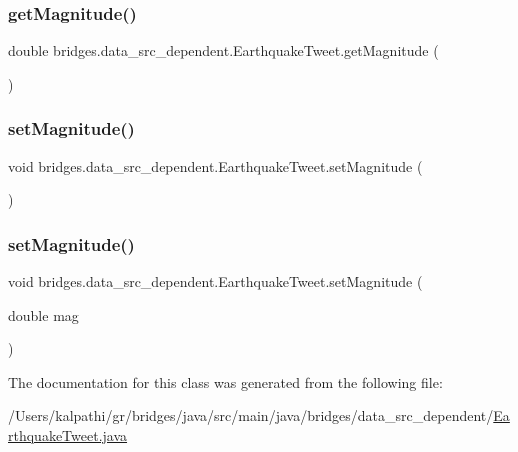 \subsubsection{\texorpdfstring{getMagnitude()}{getMagnitude()}}
{\footnotesize\ttfamily double bridges.\+data\+\_\+src\+\_\+dependent.\+Earthquake\+Tweet.\+get\+Magnitude (\begin{DoxyParamCaption}{ }\end{DoxyParamCaption})}

\mbox{\label{classbridges_1_1data__src__dependent_1_1_earthquake_tweet_a49880f314eee430098ca347cd07ff470}} 
\subsubsection{\texorpdfstring{setMagnitude()}{setMagnitude()}\hspace{0.1cm}{\footnotesize\ttfamily [1/2]}}
{\footnotesize\ttfamily void bridges.\+data\+\_\+src\+\_\+dependent.\+Earthquake\+Tweet.\+set\+Magnitude (\begin{DoxyParamCaption}{ }\end{DoxyParamCaption})}

\mbox{\label{classbridges_1_1data__src__dependent_1_1_earthquake_tweet_a763d8a261a563e66af95c5a97850ecc0}} 
\subsubsection{\texorpdfstring{setMagnitude()}{setMagnitude()}\hspace{0.1cm}{\footnotesize\ttfamily [2/2]}}
{\footnotesize\ttfamily void bridges.\+data\+\_\+src\+\_\+dependent.\+Earthquake\+Tweet.\+set\+Magnitude (\begin{DoxyParamCaption}\item[{double}]{mag }\end{DoxyParamCaption})}



The documentation for this class was generated from the following file\+:\begin{DoxyCompactItemize}
\item 
/\+Users/kalpathi/gr/bridges/java/src/main/java/bridges/data\+\_\+src\+\_\+dependent/\mbox{\hyperlink{_earthquake_tweet_8java}{Earthquake\+Tweet.\+java}}\end{DoxyCompactItemize}
